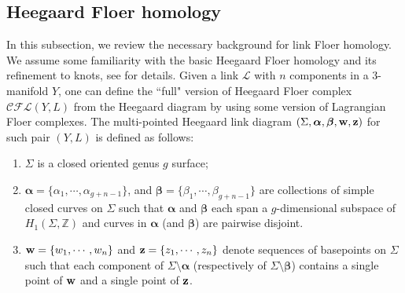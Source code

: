 \documentclass{amsart}
\newtheorem{lemma}[theorem]{Lemma}
\newtheorem{definition}[theorem]{Definition}
\newcommand{\cCFL}{\mathcal{C\!F\!L}}
\newcommand{\alphas}{\boldsymbol{\alpha}}
\newcommand{\betas}{\boldsymbol{\beta}}
\newcommand{\w}{\mathbf{w}}
\def\L{\mathcal{L}}
\def\w{{\bf{w}}}
\def\z{{\bf{z}}}
\newcommand{\Z}{\mathbb{Z}}
\newcommand{\EG}[1]{{\color{red}#1}}
\newcommand{\BL}[1]{{\color{purple}#1--Beibei}}
\newcommand{\Id}{\mathrm{Id}}
\begin{document}


\subsection{Heegaard Floer homology}

In this subsection, we review the necessary background for link Floer homology. We assume some familiarity with the basic Heegaard Floer homology and its refinement to knots, see \cite{OSProperties, OSKnots, OSLinks, RasmussenKnots} for details.  Given a link $\L$ with $n$ components in a 3-manifold $Y$, one can define the ``full" version of Heegaard Floer complex $\cCFL(Y, L)$ from the Heegaard diagram by using some version of Lagrangian Floer complexes. The multi-pointed Heegaard link diagram $(\Sigma, \alphas, \betas,\w, \z)$ for such pair $(Y, L)$ is defined as follows:
\begin{enumerate}
    \item  $\Sigma$ is a closed oriented genus $g$ surface;
    \item $\alphas=\{ \alpha_1, \cdots, \alpha_{g+n-1} \}$, and $\betas=\{ \beta_1, \cdots, \beta_{g+n-1}\}$ are collections of simple closed curves on $\Sigma$ such that $\alphas$ and $\betas$ each span a $g$-dimensional subspace of $H_1(\Sigma, \Z)$ and  curves in $\alphas$ (and $\betas$) are pairwise disjoint.
    \item $\w=\{w_1, \cdots, w_n\}$ and $\z=\{z_1, \cdots, z_n\}$ denote sequences of basepoints on $\Sigma$ such that each component of $\Sigma\setminus \alphas$ (respectively of $\Sigma\setminus \betas$) contains a single point of $\w$ and a single point of $\z$. 
\end{enumerate}
\end{document}
